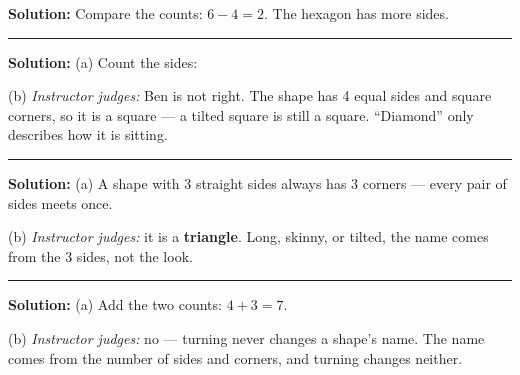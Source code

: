 \documentclass[12pt]{article}
\begin{document}
\textbf{Solution:} Compare the counts: $6 - 4 = 2$. The hexagon has
 more sides.

\vspace{0.2cm}\noindent\rule{\linewidth}{0.2pt}\vspace{0.1cm}


\textbf{Solution:} (a) Count the sides: 

(b) \emph{Instructor judges:} Ben is not right. The shape has 4 equal sides
and square corners, so it is a square --- a tilted square is still a square.
``Diamond'' only describes how it is sitting.

\vspace{0.2cm}\noindent\rule{\linewidth}{0.2pt}\vspace{0.1cm}


\textbf{Solution:} (a) A shape with 3 straight sides always has 3 corners
--- every pair of sides meets once. 

(b) \emph{Instructor judges:} it is a \textbf{triangle}. Long, skinny, or
tilted, the name comes from the 3 sides, not the look.

\vspace{0.2cm}\noindent\rule{\linewidth}{0.2pt}\vspace{0.1cm}


\textbf{Solution:} (a) Add the two counts: $4 + 3 = 7$. 

(b) \emph{Instructor judges:} no --- turning never changes a shape's name.
The name comes from the number of sides and corners, and turning changes
neither.
\end{document}
